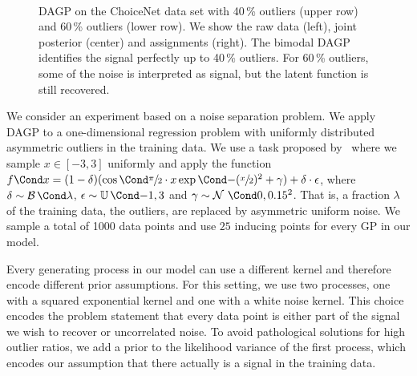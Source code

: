 \begin{figure}[t]
    \centering
    \hspace{-7pt}%
    \hspace{-7pt}%
    \\%
    \vspace{\figureskip}%
    \hspace{-7pt}%
    \hspace{-7pt}%
    \caption[DAGP noise separation experiment]{
        \label{fig:data_association:choicenet}
        DAGP on the ChoiceNet data set with 40\,\% outliers (upper row) and 60\,\% outliers (lower row).
        We show the raw data (left), joint posterior (center) and assignments (right).
        The bimodal DAGP identifies the signal perfectly up to 40\,\% outliers.
        For 60\,\% outliers, some of the noise is interpreted as signal, but the latent function is still recovered.
    }
\end{figure}
%
We consider an experiment based on a noise separation problem.
We apply DAGP to a one-dimensional regression problem with uniformly distributed asymmetric outliers in the training data.
We use a task proposed by~\textcite{choi_choicenet_2018} where we sample $x \in [-3, 3]$ uniformly and apply the function $\Fun{f}{x} = (1 - \delta)(\Fun{\cos}{\sfrac{\pi}{2} \cdot x}\Fun{\exp}{-(\sfrac{x}{2})^2} + \gamma) + \delta \cdot \epsilon$, where $\delta \sim \Fun{\Ber}{\lambda}$, $\epsilon \sim \Fun{\Uni}{-1, 3}$ and $\gamma \sim \Gaussian{0, 0.15^2}$.
That is, a fraction $\lambda$ of the training data, the outliers, are replaced by asymmetric uniform noise.
We sample a total of 1000 data points and use $25$ inducing points for every GP in our model.

Every generating process in our model can use a different kernel and therefore encode different prior assumptions.
For this setting, we use two processes, one with a squared exponential kernel and one with a white noise kernel.
This choice encodes the problem statement that every data point is either part of the signal we wish to recover or uncorrelated noise.
To avoid pathological solutions for high outlier ratios, we add a prior to the likelihood variance of the first process, which encodes our assumption that there actually is a signal in the training data.


